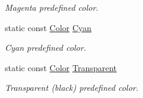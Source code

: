 \begin{DoxyCompactItemize}
\begin{DoxyCompactList}\small\item\em Magenta predefined color. \end{DoxyCompactList}\item 
static const \hyperlink{classsf_1_1_color}{Color} \hyperlink{classsf_1_1_color_a64ae9beb0b9a5865dd811cda4bb18340}{Cyan}
\begin{DoxyCompactList}\small\item\em Cyan predefined color. \end{DoxyCompactList}\item 
static const \hyperlink{classsf_1_1_color}{Color} \hyperlink{classsf_1_1_color_a569b45471737f770656f50ae7bbac292}{Transparent}
\begin{DoxyCompactList}\small\item\em Transparent (black) predefined color. \end{DoxyCompactList}\end{DoxyCompactItemize}
